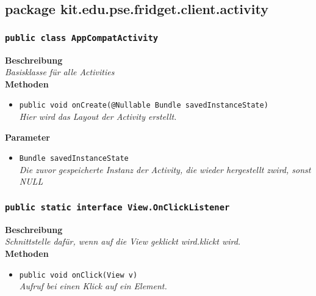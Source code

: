     	\subsection{package kit.edu.pse.fridget.client.activity}
    	\subsubsection{\texttt{public class AppCompatActivity}}
               
               	\textbf{Beschreibung} \\
      	        \textit{Basisklasse für alle Activities} \\
                
                \textbf{Methoden}
                \begin{itemize}
        		\item{\texttt{public void onCreate(@Nullable Bundle savedInstanceState)}}\\
                \textit{Hier wird das Layout der Activity erstellt.}\\
                \end{itemize}
                
                \textbf{Parameter}
                \begin{itemize}
        		\item\texttt{Bundle savedInstanceState}\\ 
                \textit{Die zuvor gespeicherte Instanz der Activity, die wieder hergestellt zwird, sonst NULL}\\
                \end{itemize}
                
    	\subsubsection{\texttt{public static interface View.OnClickListener}}
        
      	        \textbf{Beschreibung} \\
               	\textit{Schnittstelle dafür, wenn auf die View geklickt wird.klickt wird.}\\

                \textbf{Methoden}
                \begin{itemize}
                \item{\texttt{public void onClick(View v)}}\\
                \textit{Aufruf bei einen Klick auf ein Element.}\\
                \end{itemize}

